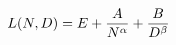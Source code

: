 \documentclass[preview]{standalone}
\begin{document}
\begin{align*}
\special{dvisvgm:raw <g id='unique000'>}L(N, D) = E + \frac{A}{N^\alpha} + \frac{B}{D^\beta}\special{dvisvgm:raw </g>}
\end{align*}
\end{document}
